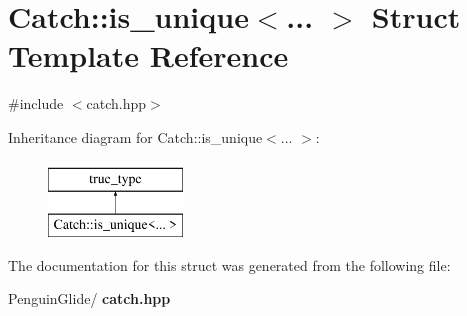 \section{Catch\+::is\+\_\+unique$<$... $>$ Struct Template Reference}
\label{struct_catch_1_1is__unique}


{\ttfamily \#include $<$catch.\+hpp$>$}

Inheritance diagram for Catch\+::is\+\_\+unique$<$... $>$\+:\begin{figure}[H]
\begin{center}
\leavevmode
\includegraphics[height=2.000000cm]{struct_catch_1_1is__unique}
\end{center}
\end{figure}


The documentation for this struct was generated from the following file\+:\begin{DoxyCompactItemize}
\item 
Penguin\+Glide/\textbf{ catch.\+hpp}\end{DoxyCompactItemize}
